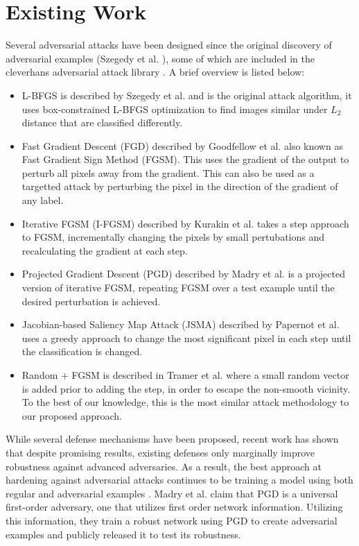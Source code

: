 \section{Existing Work}

Several adversarial attacks have been designed since the original discovery of adversarial examples (Szegedy et al. \cite{szegedy2013intriguing}), some of which are included in the cleverhans adversarial attack library \cite{GoodfellowPM16}. A brief overview is listed below:
\begin{itemize}
    \item L-BFGS is described by Szegedy et al. \cite{szegedy2013intriguing} and is the original attack algorithm, it uses box-constrained L-BFGS optimization to find images similar under $L_2$ distance that are classified differently.
    \item Fast Gradient Descent (FGD) described by Goodfellow et al. \cite{goodfellow6572explaining} also known as Fast Gradient Sign Method (FGSM). This uses the gradient of the output to perturb all pixels away from the gradient. This can also be used as a targetted attack by  perturbing the pixel in the direction of the gradient of any label.
    \item Iterative FGSM (I-FGSM) described by Kurakin et al. \cite{kurakin2016adversarial} takes a step approach to FGSM, incrementally changing the pixels by small pertubations and recalculating the gradient at each step.
    \item Projected Gradient Descent (PGD) described by Madry et al. \cite{madry2017towards} is a projected version of iterative FGSM, repeating FGSM over a test example until the desired perturbation is achieved.
    \item Jacobian-based Saliency Map Attack (JSMA) described by Papernot et al. \cite{papernot2016limitations} uses a greedy approach to change the most significant pixel in each step until the classification is changed.
    \item Random + FGSM is described in Tramer et al. \cite{tramer2017ensemble} where a small random vector is added prior to adding the step, in order to escape the non-smooth vicinity. To the best of our knowledge, this is the most similar attack methodology to our proposed approach.
    

\end{itemize}

While several defense mechanisms have been proposed, recent work \cite{carlini2017towards} has shown that despite promising results, existing defenses only marginally improve robustness against advanced adversaries. As a result, the best approach at hardening against adversarial attacks continues to be training a model using both regular and adversarial examples \cite{madry2017towards}. Madry et al. claim that PGD is a universal first-order adversary, one that utilizes first order network information. Utilizing this information, they train a robust network using PGD to create adversarial examples and publicly released it to test its robustness.
